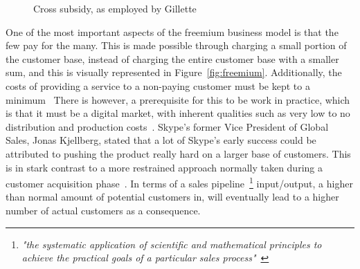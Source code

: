 \begin{figure}
    \centering
    \caption{Cross subsidy, as employed by Gillette~\cite{chrisanderson2008}}
    \label{fig:gillette}
\end{figure}


One of the most important aspects of the freemium business model is that the few pay for the many. This is made possible through charging a small portion of the customer base, instead of charging the entire customer base with a smaller sum, and this is visually represented in Figure~\ref{fig:freemium}. Additionally, the costs of providing a service to a non-paying customer must be kept to a minimum~\cite{chrisanderson2008feb} There is however, a prerequisite for this to be work in practice, which is that it must be a digital market, with inherent qualities such as very low to no distribution and production costs~\cite{chrisanderson2008}. Skype's former Vice President of Global Sales, Jonas Kjellberg, stated that a lot of Skype's early success could be attributed to pushing the product really hard on a larger base of customers. This is in stark contrast to a more restrained approach normally taken during a customer acquisition phase~\cite{jonaskjellberg2014}. In terms of a sales pipeline~\footnote{\textit{"the systematic application of scientific and mathematical principles to achieve the practical goals of a particular sales process"}~\cite{selden1996}} input/output, a higher than normal amount of potential customers in, will eventually lead to a higher number of actual customers as a consequence.

